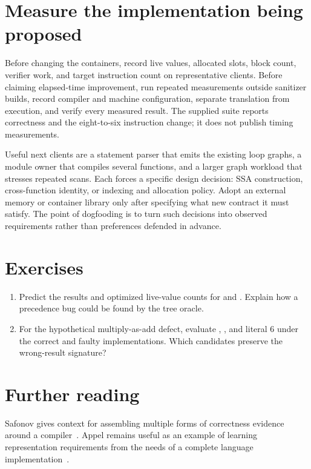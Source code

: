 \section{Measure the implementation being proposed}
\label{sec:pebble-measure}
Before changing the containers, record live values, allocated slots, block count, verifier work, and target instruction count on representative clients.
Before claiming elapsed-time improvement, run repeated measurements outside sanitizer builds, record compiler and machine configuration, separate translation from execution, and verify every measured result.
The supplied suite reports correctness and the eight-to-six instruction change; it does not publish timing measurements.

Useful next clients are a statement parser that emits the existing loop graphs, a module owner that compiles several functions, and a larger graph workload that stresses repeated scans.
Each forces a specific design decision: SSA construction, cross-function identity, or indexing and allocation policy.
Adopt an external memory or container library only after specifying what new contract it must satisfy.
The point of dogfooding is to turn such decisions into observed requirements rather than preferences defended in advance.

\section{Exercises}
\label{sec:pebble-sixteen-exercises}
\begin{enumerate}
\item \label{ex:pebble-precedence} Predict the results and optimized live-value counts for  and . Explain how a precedence bug could be found by the tree oracle.
\item \label{ex:pebble-reduction-signature} For the hypothetical multiply-as-add defect, evaluate , , and literal 6 under the correct and faulty implementations. Which candidates preserve the wrong-result signature?
\end{enumerate}

\section{Further reading}
\label{sec:pebble-sixteen-reading}
Safonov gives context for assembling multiple forms of correctness evidence around a compiler~\cite{safonov-2010-trustworthy}.
Appel remains useful as an example of learning representation requirements from the needs of a complete language implementation~\cite{appel-1998-modern}.
